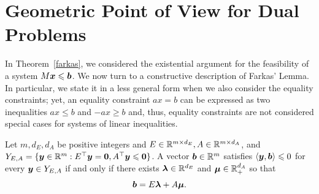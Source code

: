 \section{Geometric Point of View for Dual Problems}

In Theorem~\ref{farkas}, we considered the existential argument for the feasibility of a system $M{\boldsymbol x}\leqslant {\boldsymbol b}$. We now turn to a constructive description of Farkas' Lemma. In particular, we state it in a less general form when we also consider the equality constraints; yet, an equality constraint $ ax = b$ can be expressed as two inequalities $ax\leq b$ and $-ax\geq b$ and, thus, equality constraints are not considered special cases for systems of linear inequalities.  

\begin{theorem}\label{farkas geo}
Let $m,  d_E, d_A$ be positive integers and $E\in\mathbb R^{m\times d_E}, A\in\mathbb R^{m\times d_A}$, and $Y_{E, A} = \{{\boldsymbol y}\in \mathbb R^{m}: E^\top \boldsymbol y = \boldsymbol0, A^\top \boldsymbol y \leqslant \boldsymbol0\}$. A vector $ {\boldsymbol b}\in\mathbb R^{m}$ satisfies $\left\langle\boldsymbol y, \boldsymbol b\right\rangle\leqslant 0$ for every ${\boldsymbol y}\in Y_{E, A}$ if and only if there exists $\boldsymbol\lambda\in\mathbb R^{d_E}$ and $\boldsymbol\mu\in\mathbb R^{d_A}_+$ so that 
\begin{equation}\label{eqn: farkas geo} {\boldsymbol b} = E\boldsymbol\lambda + A\boldsymbol\mu. \end{equation}
\end{theorem} 
